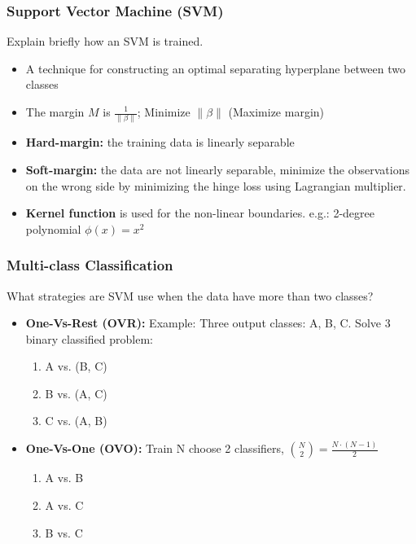\documentclass[aspectratio=169, 10pt]{beamer}
\begin{document}
\begin{frame}[t]
    \frametitle{Support Vector Machine (SVM)}
    Explain briefly how an SVM is trained.

    \begin{itemize}
        \item A technique for constructing an optimal separating hyperplane between two classes
        \item The margin $M$ is $\frac{1}{\|\beta\|}$; Minimize $\|\beta\|$ (Maximize margin)
        \item \textbf{Hard-margin:} the training data is linearly separable
        \item \textbf{Soft-margin:} the data are not linearly separable, minimize the observations on the wrong side by minimizing the hinge loss using Lagrangian multiplier.
        \item \textbf{Kernel function} is used for the non-linear boundaries. e.g.: 2-degree polynomial $\phi(x)=x^2$ 
    \end{itemize}

\end{frame}

\begin{frame}[t]
    \frametitle{Multi-class Classification}
    What strategies are SVM use when the data have more than two classes?
    \pause

    \begin{itemize}
        \item \textbf{One-Vs-Rest (OVR):} Example: Three output classes: A, B, C. 
        Solve 3 binary classified problem: 
            \begin{enumerate}
                \item A vs. (B, C)
                \item B vs. (A, C)
                \item C vs. (A, B)
            \end{enumerate}
        \item \textbf{One-Vs-One (OVO):} Train N choose 2 classifiers, ${N \choose 2} = \frac{N \cdot (N-1)}{2}$
            \begin{enumerate}
                \item A vs. B
                \item A vs. C
                \item B vs. C
            \end{enumerate}
    \end{itemize}

\end{frame}
\end{document}
